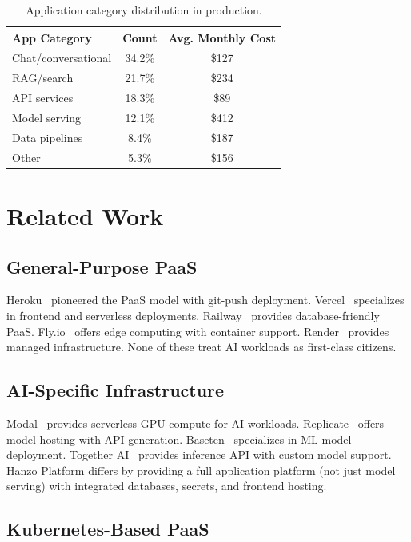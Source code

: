 \documentclass[11pt,twocolumn]{article}
\begin{document}
\begin{table}[H]
\centering
\small
\begin{tabular}{lcc}
\toprule
\textbf{App Category} & \textbf{Count} & \textbf{Avg. Monthly Cost} \\
\midrule
Chat/conversational & 34.2\% & \$127 \\
RAG/search & 21.7\% & \$234 \\
API services & 18.3\% & \$89 \\
Model serving & 12.1\% & \$412 \\
Data pipelines & 8.4\% & \$187 \\
Other & 5.3\% & \$156 \\
\bottomrule
\end{tabular}
\caption{Application category distribution in production.}
\label{tab:app_dist}
\end{table}

\section{Related Work}
\label{sec:related}

\subsection{General-Purpose PaaS}

Heroku~\cite{heroku2007} pioneered the PaaS model with git-push deployment. Vercel~\cite{vercel2020} specializes in frontend and serverless deployments. Railway~\cite{railway2021} provides database-friendly PaaS. Fly.io~\cite{flyio2020} offers edge computing with container support. Render~\cite{render2019} provides managed infrastructure. None of these treat AI workloads as first-class citizens.

\subsection{AI-Specific Infrastructure}

Modal~\cite{modal2023} provides serverless GPU compute for AI workloads. Replicate~\cite{replicate2022} offers model hosting with API generation. Baseten~\cite{baseten2022} specializes in ML model deployment. Together AI~\cite{together2023} provides inference API with custom model support. Hanzo Platform differs by providing a full application platform (not just model serving) with integrated databases, secrets, and frontend hosting.

\subsection{Kubernetes-Based PaaS}
\end{document}
